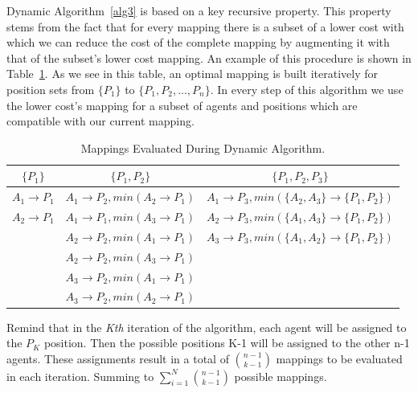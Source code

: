 Dynamic Algorithm~\ref{alg3} is based on a key recursive property. This property stems from the fact that for every mapping there is a subset of a lower cost with which we can reduce the cost of the complete mapping by augmenting it with that of the subset's lower cost mapping.
An example of this procedure is shown in Table~\ref{tab:DynamicTable}. As we see in this table, an optimal mapping is built iteratively for position sets from $\lbrace P_{1} \rbrace$ to $\lbrace P_{1},P_{2},...,P_{n} \rbrace$. In every step of this algorithm we use the lower cost's mapping for a subset of agents and positions which are compatible with our current mapping.
\begin{table}[t!]
\caption{Mappings Evaluated During Dynamic Algorithm.}
\label{tab:DynamicTable}
\centering
	
    \begin{tabular}{ | c | c | c | }
    \hline
    $\lbrace P_{1} \rbrace$   & $\lbrace P_{1},P_{2} \rbrace$ 	& $\lbrace P_{1},P_{2},P_{3} \rbrace$\\ \hline
    $A_{1} \rightarrow P_{1}$ & $A_{1} \rightarrow P_{2},min(A_{2} \rightarrow P_{1})$	 	& $A_{1} \rightarrow P_{3},min(\lbrace A_{2},A_{3} \rbrace \rightarrow \lbrace P_{1},P_{2} \rbrace)$  \\ 
    $A_{2} \rightarrow P_{1}$ & $A_{1} \rightarrow P_{1},min(A_{3} \rightarrow P_{1})$	 	& $A_{2} \rightarrow P_{3},min(\lbrace A_{1},A_{3} \rbrace \rightarrow \lbrace P_{1},P_{2} \rbrace)$  \\ 
     						  & $A_{2} \rightarrow P_{2},min(A_{1} \rightarrow P_{1})$ 		& $A_{3} \rightarrow P_{3},min(\lbrace A_{1},A_{2} \rbrace \rightarrow \lbrace P_{1},P_{2} \rbrace)$  \\ 
       						  & $A_{2} \rightarrow P_{2},min(A_{3} \rightarrow P_{1})$ 		&   \\ 
       						  & $A_{3} \rightarrow P_{2},min(A_{1} \rightarrow P_{1})$ 		&   \\ 
    						  & $A_{3} \rightarrow P_{2},min(A_{2} \rightarrow P_{1})$		&   \\
    \hline
    \end{tabular}      
\end{table}
Remind that in the \textit{Kth} iteration of the algorithm, each agent will be assigned to the $P_{K}$ position. Then the possible positions K-1 will be assigned to the other n-1 agents. These assignments result in a total of $ {{n-1}\choose{k-1}} $ mappings to be evaluated in each iteration. Summing to $\sum\limits_{i=1}^N{{n-1}\choose{k-1}}$ possible mappings.\\
